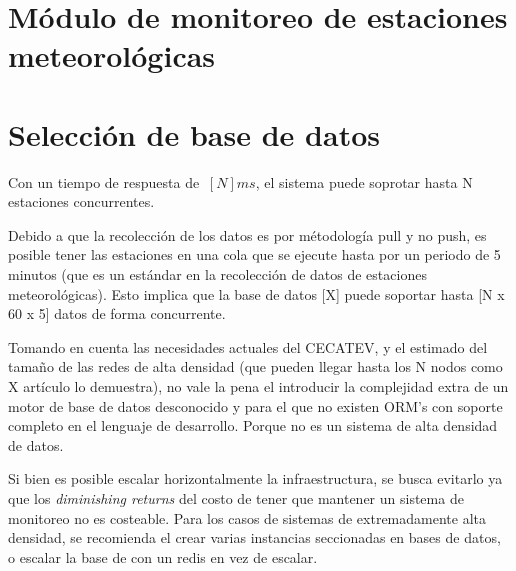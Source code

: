 \section{Módulo de monitoreo de estaciones meteorológicas}





\section{Selección de base de datos}





Con un tiempo de respuesta de $~[N]ms$, el sistema puede soprotar hasta N estaciones concurrentes.

Debido a que la recolección de los datos es por métodología pull y no push, es posible tener las estaciones en una cola que se ejecute hasta por un periodo de 5 minutos (que es un estándar en la recolección de datos de estaciones meteorológicas). Esto implica que la base de datos [X] puede soportar hasta [N x 60 x 5] datos de forma concurrente.

Tomando en cuenta las necesidades actuales del CECATEV, y el estimado del tamaño de las redes de alta densidad (que pueden llegar hasta los N nodos como X artículo lo demuestra), no vale la pena el introducir la complejidad extra de un motor de base de datos desconocido y para el que no existen ORM's con soporte completo en el lenguaje de desarrollo. Porque no es un sistema de alta densidad de datos.

Si bien es posible escalar horizontalmente la infraestructura, se busca evitarlo ya que los \textit{diminishing returns} del costo de tener que mantener un sistema de monitoreo no es costeable. Para los casos de sistemas de extremadamente alta densidad, se recomienda el crear varias instancias seccionadas en bases de datos, o escalar la base de con un redis en vez de escalar.


